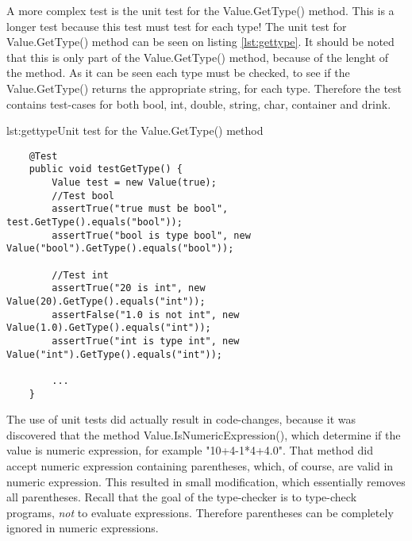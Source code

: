 
A more complex test is the unit test for the Value.GetType() method. This is a longer test because this test must test for each type! The unit test for Value.GetType() method can be seen on listing \ref{lst:gettype}. It should be noted that this is only part of the Value.GetType() method, because of the lenght of the method. As it can be seen each type must be checked, to see if the Value.GetType() returns the appropriate string, for each type. Therefore the test contains test-cases for both bool, int, double, string, char, container and drink. 

\begin{code}{lst:gettype}{Unit test for the Value.GetType() method}
\begin{lstlisting}
	@Test
	public void testGetType() {
	    Value test = new Value(true);
	    //Test bool
	    assertTrue("true must be bool", test.GetType().equals("bool"));
	    assertTrue("bool is type bool", new Value("bool").GetType().equals("bool"));
	    
	    //Test int
	    assertTrue("20 is int", new Value(20).GetType().equals("int"));
	    assertFalse("1.0 is not int", new Value(1.0).GetType().equals("int"));
	    assertTrue("int is type int", new Value("int").GetType().equals("int"));
	
		...    
	}
\end{lstlisting}
\end{code}

The use of unit tests did actually result in code-changes, because it was discovered that the method Value.IsNumericExpression(), which determine if the value is numeric expression, for example "10+4-1*4+4.0". That method did accept numeric expression containing parentheses, which, of course, are valid in numeric expression. This resulted in small modification, which essentially removes all parentheses. Recall that the goal of the type-checker is to type-check programs, \emph{not} to evaluate expressions. Therefore parentheses can be completely ignored in numeric expressions. 